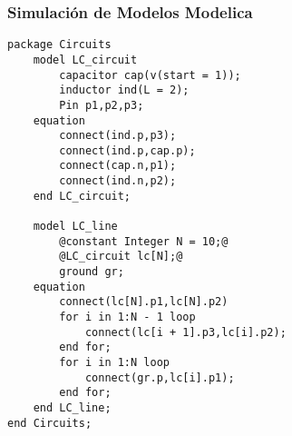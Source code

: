 \begin{frame}[fragile]
\frametitle{Simulación de Modelos Modelica} 
\begin{lstlisting}[style=base,basicstyle=\tiny]
package Circuits
    model LC_circuit
        capacitor cap(v(start = 1));
        inductor ind(L = 2);
        Pin p1,p2,p3;
    equation
        connect(ind.p,p3);
        connect(ind.p,cap.p);
        connect(cap.n,p1);
        connect(ind.n,p2);
    end LC_circuit;
    
    model LC_line
        @constant Integer N = 10;@
        @LC_circuit lc[N];@
        ground gr;
    equation
        connect(lc[N].p1,lc[N].p2)      
        for i in 1:N - 1 loop
            connect(lc[i + 1].p3,lc[i].p2);
        end for;
        for i in 1:N loop
            connect(gr.p,lc[i].p1);
        end for;
    end LC_line;
end Circuits;   
\end{lstlisting}
\end{frame}
